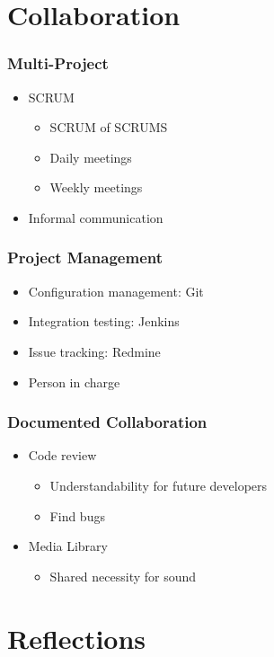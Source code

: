	\section{Collaboration}
		\begin{frame}
			\frametitle{Multi-Project}
			\begin{itemize}
				\item SCRUM
				\begin{itemize}
					\item SCRUM of SCRUMS
					\item Daily meetings
					\item Weekly meetings
				\end{itemize}
				\item Informal communication
			\end{itemize}
		\end{frame}
		
		\begin{frame}
			\frametitle{Project Management}
			\begin{itemize}
				\item Configuration management: Git
				\item Integration testing: Jenkins
				\item Issue tracking: Redmine
				\item Person in charge
			\end{itemize}
		\end{frame}
		
		\begin{frame}
			\frametitle{Documented Collaboration}
			\begin{itemize}
				\item Code review
				\begin{itemize}
					\item Understandability for future developers
					\item Find bugs
				\end{itemize}
				\item Media Library
					\begin{itemize}
					\item Shared necessity for sound
					\end{itemize}
			\end{itemize}
		\end{frame}
		
		
	\section{Reflections}
		
